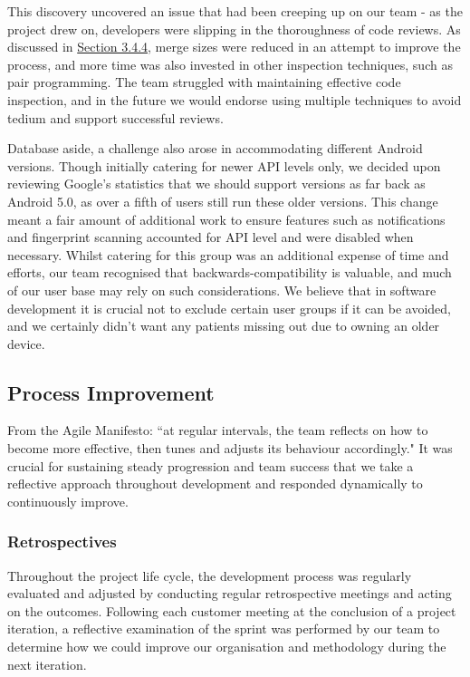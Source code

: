 \documentclass{l3proj}
\begin{document}
This discovery uncovered an issue that had been creeping up on our team - as the project drew on, developers were slipping in the thoroughness of code reviews. As discussed in \hyperref[sec:3.4.4]{Section 3.4.4}, merge sizes were reduced in an attempt to improve the process, and more time was also invested in other inspection techniques, such as pair programming. The team struggled with maintaining effective code inspection, and in the future we would endorse using multiple techniques to avoid tedium and support successful reviews. 

Database aside, a challenge also arose in accommodating different Android versions. Though initially catering for newer API levels only, we decided upon reviewing Google’s statistics \cite{dashboards} that we should support versions as far back as Android 5.0, as over a fifth of users still run these older versions. This change meant a fair amount of additional work to ensure features such as notifications and fingerprint scanning accounted for API level and were disabled when necessary. Whilst catering for this group was an additional expense of time and efforts, our team recognised that backwards-compatibility is valuable, and much of our user base may rely on such considerations. We believe that in software development it is crucial not to exclude certain user groups if it can be avoided, and we certainly didn't want any patients missing out due to owning an older device. 


\subsection{Process Improvement} \label{sec:3.4}
From the Agile Manifesto: ``at regular intervals, the team reflects on how to become more effective, then tunes and adjusts its behaviour accordingly."\cite{AgileManifesto} It was crucial for sustaining steady progression and team success that we take a reflective approach throughout development and responded dynamically to continuously improve.


\subsubsection{Retrospectives} \label{sec:3.4.1}
Throughout the project life cycle, the development process was regularly evaluated and adjusted by conducting regular retrospective meetings and acting on the outcomes. Following each customer meeting at the conclusion of a project iteration, a reflective examination of the sprint was performed by our team to determine how we could improve our organisation and methodology during the next iteration. 
\end{document}
